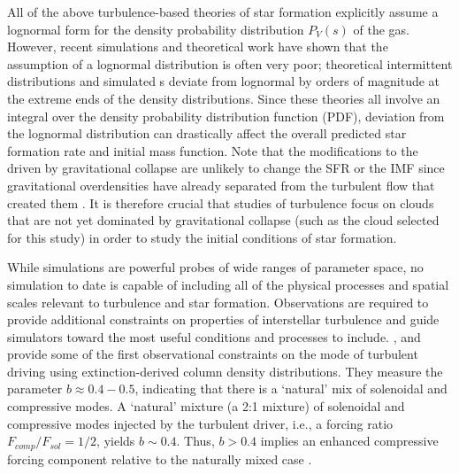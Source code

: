 
All of the above turbulence-based theories of star formation explicitly assume a
lognormal form for the density probability distribution $P_V(s)$ of the gas. %
However, recent simulations \citep{Kritsuk2007a, Schmidt2009a, Federrath2010a, Konstandin2012a, Federrath2013a, Federrath2013b} and theoretical work
\citep{Hopkins2013a} have shown that the assumption of a
lognormal distribution is often very poor; theoretical intermittent distributions and 
simulated \rhoPDF s deviate from lognormal by orders of magnitude
at the extreme ends of the density distributions.  Since these theories all involve
an integral over the density probability distribution function (PDF), deviation from
the lognormal distribution can drastically affect the overall predicted star formation
rate \citep[e.g.][]{Cho2011a,Collins2012a} and initial mass function.
Note that the modifications to the \rhoPDF driven by gravitational collapse
are unlikely to change the SFR or the IMF since gravitational overdensities have already
separated from the turbulent flow that created them
\citep{Klessen2000a,Kritsuk2011a,Federrath2012a,Federrath2013a}. It is therefore crucial that
studies of turbulence focus on clouds that are not yet dominated by
gravitational collapse (such as the cloud selected for this study) in order to study the initial conditions of star formation.

While simulations are powerful probes of wide ranges of parameter space, no
simulation to date is capable of including all of the physical processes and spatial
scales relevant to turbulence and star formation.  Observations are required to provide additional
constraints on properties of interstellar turbulence and guide simulators
toward the most useful conditions and processes to include.
\citet{Brunt2010c}, \citet{Kainulainen2013c} and \citet{Kainulainen2013a}
provide some of the first observational constraints on the mode of turbulent
driving using extinction-derived column density distributions.
They measure the parameter $b\approx0.4-0.5$, indicating that there is a `natural' mix of solenoidal
and compressive modes.  A `natural' mixture (a 2:1 mixture) of solenoidal and
compressive modes injected by the turbulent driver, i.e., a forcing ratio
$F_{comp}/F_{sol} = 1/2$, yields $b\sim0.4$. Thus, $b>0.4$ implies an enhanced
compressive forcing component relative to the naturally mixed case \citep[see
Figure 8 in][]{Federrath2010a}.


